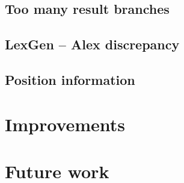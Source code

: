 \documentclass[a4paper,12pt,twosided]{report}
\begin{document}
\subsection{Too many result branches}
\subsection{LexGen -- Alex discrepancy}
\subsection{Position information}

\section{Improvements}
\section{Future work}

%
%



%
%
\end{document}
